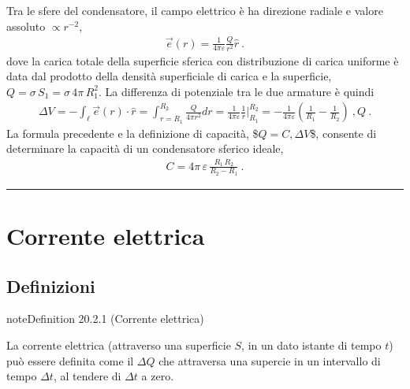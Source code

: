 \documentclass[letterpaper,10pt,italian]{jupyterBook}
\begin{document}
\sphinxAtStartPar
Tra le sfere del condensatore, il campo elettrico è ha direzione radiale e valore assoluto \(\propto r^{-2}\),
\begin{equation*}
\begin{split}\vec{e}(r) = \frac{1}{4 \pi \varepsilon} \frac{Q}{r^2} \hat{r} \ .\end{split}
\end{equation*}
\sphinxAtStartPar
dove la carica totale della superficie sferica con distribuzione di carica uniforme è data dal prodotto della densità superficiale di carica e la superficie, \(Q = \sigma \, S_1 = \sigma \, 4 \pi \, R_1^2\).
La differenza di potenziale tra le due armature è quindi
\begin{equation*}
\begin{split}\Delta V = - \int_{\ell} \vec{e}(r) \cdot \hat{r} = \int_{r=R_1}^{R_2} \frac{Q}{4 \pi r^2} dr = \frac{1}{4 \pi \varepsilon} \frac{1}{r} \bigg|_{R_1}^{R_2} = - \frac{1}{4 \pi \varepsilon} \left(\frac{1}{R_1} - \frac{1}{R_2} \right) \ , Q \ .\end{split}
\end{equation*}
\sphinxAtStartPar
La formula precedente e la definizione di capacità, \$\(Q = C , \Delta V\)\$, consente di determinare la capacità di un condensatore sferico ideale,
\begin{equation*}
\begin{split}C = 4 \pi \, \varepsilon \,  \frac{R_1 \, R_2}{R_2 - R_1} \ .\end{split}
\end{equation*}



\bigskip\hrule\bigskip


\sphinxstepscope


\section{Corrente elettrica}
\label{\detokenize{ch/electromagnetism/electric-current:corrente-elettrica}}\label{\detokenize{ch/electromagnetism/electric-current:physics-hs-electromagnetism-electric-current}}\label{\detokenize{ch/electromagnetism/electric-current::doc}}



\subsection{Definizioni}
\label{\detokenize{ch/electromagnetism/electric-current:definizioni}}\label{ch/electromagnetism/electric-current:electric-current}
\begin{sphinxadmonition}{note}{Definition 20.2.1 (Corrente elettrica)}



\sphinxAtStartPar
La corrente elettrica (attraverso una superficie \(S\), in un dato istante di tempo \(t\)) può essere definita come il  \(\Delta Q\) che attraversa una supercie in un intervallo di tempo \(\Delta t\), al tendere di \(\Delta t\) a zero.
\end{sphinxadmonition}
\end{document}
